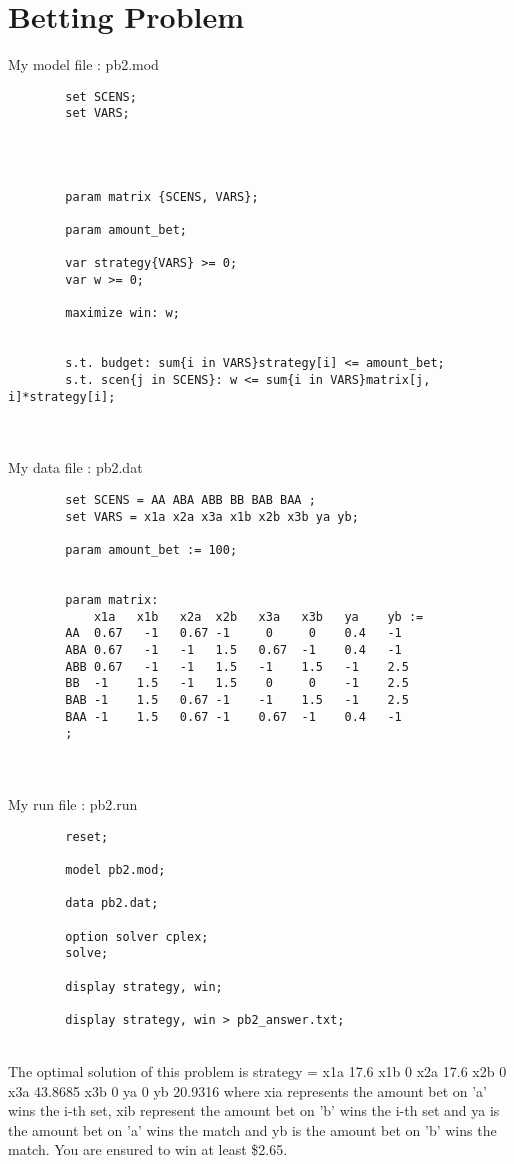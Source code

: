 \documentclass{article}
\newenvironment{DDbox}[1]{
\begin{lrbox}{\BBbox}
    \begin{minipage}{\linewidth}}
{\end{minipage}
\end{lrbox}\noindent\colorbox{Zgris}{\usebox{\BBbox}} \\
[.5cm]}
\begin{document}
\section*{Betting Problem}
My model file : pb2.mod
\\
\begin{DDbox}{\linewidth}
    \begin{verbatim}
        set SCENS;
        set VARS;


        

        param matrix {SCENS, VARS};

        param amount_bet;

        var strategy{VARS} >= 0;
        var w >= 0;

        maximize win: w;


        s.t. budget: sum{i in VARS}strategy[i] <= amount_bet;
        s.t. scen{j in SCENS}: w <= sum{i in VARS}matrix[j, i]*strategy[i];
    \end{verbatim}
\end{DDbox}
\\
My data file : pb2.dat
\\
\begin{DDbox}{\linewidth}
    \begin{verbatim}
        set SCENS = AA ABA ABB BB BAB BAA ;
        set VARS = x1a x2a x3a x1b x2b x3b ya yb;
        
        param amount_bet := 100;
        
        
        param matrix: 
            x1a   x1b   x2a  x2b   x3a   x3b   ya    yb :=
        AA  0.67   -1   0.67 -1     0     0    0.4   -1
        ABA 0.67   -1   -1   1.5   0.67  -1    0.4   -1
        ABB 0.67   -1   -1   1.5   -1    1.5   -1    2.5
        BB  -1    1.5   -1   1.5    0     0    -1    2.5
        BAB -1    1.5   0.67 -1    -1    1.5   -1    2.5
        BAA -1    1.5   0.67 -1    0.67  -1    0.4   -1
        ;
    \end{verbatim}
\end{DDbox}
\\
My run file : pb2.run
\\
\begin{DDbox}{\linewidth}
    \begin{verbatim}
        reset;

        model pb2.mod;

        data pb2.dat;

        option solver cplex;
        solve;

        display strategy, win;

        display strategy, win > pb2_answer.txt;
    \end{verbatim}
\end{DDbox}
\newpage
The optimal solution of this problem is strategy = x1a  17.6 x1b   0 x2a  17.6 x2b   0 x3a  43.8685 x3b   0 ya   0 yb  20.9316
where xia represents the amount bet on 'a' wins the i-th set,
 xib represent the amount bet on 'b' wins the i-th set and
 ya is the amount bet on 'a' wins the match and yb is the amount bet on 'b' wins the match.
You are ensured to win at least \$2.65.
\end{document}
